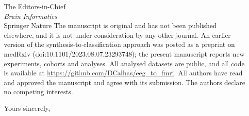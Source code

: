 \documentclass[11pt]{letter}
\begin{document}
\begin{letter}{The Editors-in-Chief\\\textit{Brain Informatics}\\Springer Nature}
The manuscript is original and has not been published elsewhere, and it is not under consideration by any other journal. An earlier version of the synthesis-to-classification approach was posted as a preprint on medRxiv (doi:10.1101/2023.08.07.23293748); the present manuscript reports new experiments, cohorts and analyses. All analysed datasets are public, and all code is available at \url{https://github.com/DCalhas/eeg_to_fmri}. All authors have read and approved the manuscript and agree with its submission. The authors declare no competing interests.


\closing{Yours sincerely,}
\end{letter}
\end{document}
